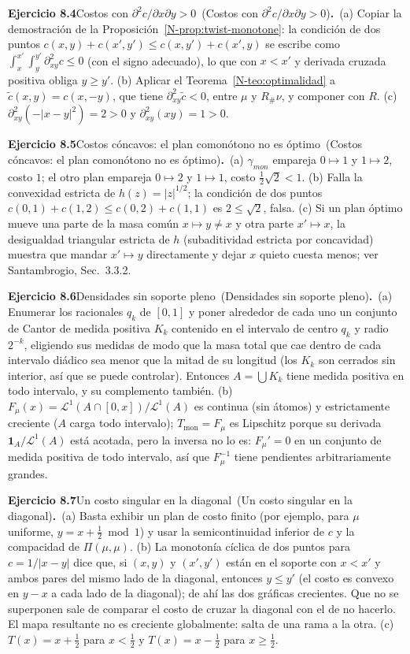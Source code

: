 \documentclass[11pt,a4paper]{amsart}
\newcommand{\LL}{{\mathcal L}}
\newcommand{\I}{{\mathbf 1}}
\theoremstyle{remark}
\theoremstyle{definition}
\numberwithin{subsection}{section}
\numberwithin{equation}{section}
\newcommand{\ejlabel}[2]{\par\medskip\noindent\textbf{Ejercicio #1}\ifx\relax#2\relax\else\ (#2)\fi\textbf{.}\ }
\begin{document}
\ejlabel{8.4}{Costos con $\partial^2c/\partial x\partial y>0$}(a) Copiar la demostración de la Proposición~\ref{N-prop:twist-monotone}: la condición de dos puntos $c(x,y)+c(x',y')\le c(x,y')+c(x',y)$ se escribe como $\int_x^{x'}\int_{y}^{y'}\partial^2_{xy}c\le0$ (con el signo adecuado), lo que con $x<x'$ y derivada cruzada positiva obliga $y\ge y'$. (b) Aplicar el Teorema~\ref{N-teo:optimalidad} a $\tilde c(x,y)=c(x,-y)$, que tiene $\partial^2_{xy}\tilde c<0$, entre $\mu$ y $R_\#\nu$, y componer con $R$. (c) $\partial^2_{xy}(-|x-y|^2)=2>0$ y $\partial^2_{xy}(xy)=1>0$.

\ejlabel{8.5}{Costos cóncavos: el plan comonótono no es óptimo}(a) $\gamma_{mon}$ empareja $0\mapsto1$ y $1\mapsto2$, costo $1$; el otro plan empareja $0\mapsto2$ y $1\mapsto1$, costo $\frac12\sqrt2<1$. (b) Falla la convexidad estricta de $h(z)=|z|^{1/2}$; la condición de dos puntos $c(0,1)+c(1,2)\le c(0,2)+c(1,1)$ es $2\le\sqrt2$, falsa. (c) Si un plan óptimo mueve una parte de la masa común $x\mapsto y\ne x$ y otra parte $x'\mapsto x$, la desigualdad triangular estricta de $h$ (subaditividad estricta por concavidad) muestra que mandar $x'\mapsto y$ directamente y dejar $x$ quieto cuesta menos; ver Santambrogio, Sec.~3.3.2.

\ejlabel{8.6}{Densidades sin soporte pleno}(a) Enumerar los racionales $q_k$ de $[0,1]$ y poner alrededor de cada uno un conjunto de Cantor de medida positiva $K_k$ contenido en el intervalo de centro $q_k$ y radio $2^{-k}$, eligiendo sus medidas de modo que la masa total que cae dentro de cada intervalo diádico sea menor que la mitad de su longitud (los $K_k$ son cerrados sin interior, así que se puede controlar). Entonces $A=\bigcup K_k$ tiene medida positiva en todo intervalo, y su complemento también. (b) $F_\mu(x)=\LL^1(A\cap[0,x])/\LL^1(A)$ es continua (sin átomos) y estrictamente creciente ($A$ carga todo intervalo); $T_\text{mon}=F_\mu$ es Lipschitz porque su derivada $\I_A/\LL^1(A)$ está acotada, pero la inversa no lo es: $F_\mu'=0$ en un conjunto de medida positiva de todo intervalo, así que $F_\mu^{-1}$ tiene pendientes arbitrariamente grandes.

\ejlabel{8.7}{Un costo singular en la diagonal}(a) Basta exhibir un plan de costo finito (por ejemplo, para $\mu$ uniforme, $y=x+\frac12 \bmod 1$) y usar la semicontinuidad inferior de $c$ y la compacidad de $\Pi(\mu,\mu)$. (b) La monotonía cíclica de dos puntos para $c=1/|x-y|$ dice que, si $(x,y)$ y $(x',y')$ están en el soporte con $x<x'$ y ambos pares del mismo lado de la diagonal, entonces $y\le y'$ (el costo es convexo en $y-x$ a cada lado de la diagonal); de ahí las dos gráficas crecientes. Que no se superponen sale de comparar el costo de cruzar la diagonal con el de no hacerlo. El mapa resultante no es creciente globalmente: salta de una rama a la otra. (c) $T(x)=x+\frac12$ para $x<\frac12$ y $T(x)=x-\frac12$ para $x\ge\frac12$.
\end{document}
